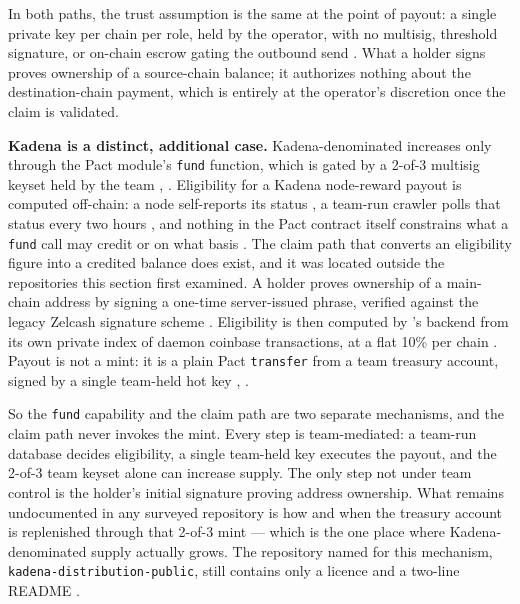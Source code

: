 In both paths, the trust assumption is the same at the point of payout: a single private key per
chain per role, held by the \Fusion operator, with no multisig, threshold signature, or on-chain
escrow gating the outbound send \shipped {}. What a holder
signs proves ownership of a source-chain balance; it authorizes nothing about the destination-chain
payment, which is entirely at the operator's discretion once the claim is validated.

\textbf{Kadena is a distinct, additional case.} Kadena-denominated \flux increases only through the
Pact module's \texttt{fund} function, which is gated by a 2-of-3 multisig keyset held by the team
\shipped {}, . Eligibility for a Kadena node-reward payout is
computed off-chain: a node self-reports its status
\shipped {}, a team-run crawler polls that
status every two hours \shipped {}, and
nothing in the Pact contract itself constrains what a \texttt{fund} call may credit or on what basis
\shipped {}. The claim path that converts an eligibility figure into a credited balance
does exist, and it was located outside the repositories this section first examined. A holder proves
ownership of a main-chain address by signing a one-time server-issued phrase, verified against the
legacy Zelcash signature scheme \shipped {}.
Eligibility is then computed by \Fusion's backend from its own private index of \Flux daemon coinbase
transactions, at a flat 10\% per chain
\shipped {}. Payout is not a mint: it is a
plain Pact \texttt{transfer} from a team treasury account, signed by a single team-held hot key
\shipped {}, .

So the \texttt{fund} capability and the claim path are two separate mechanisms, and the claim path
never invokes the mint. Every step is team-mediated: a team-run database decides eligibility, a single
team-held key executes the payout, and the 2-of-3 team keyset alone can increase supply. The only step
not under team control is the holder's initial signature proving address ownership. What remains
undocumented in any surveyed repository is how and when the treasury account is replenished through
that 2-of-3 mint --- which is the one place where Kadena-denominated supply actually grows. The
repository named for this mechanism, \texttt{kadena-\allowbreak{}distribution-\allowbreak{}public}, still contains only a licence
and a two-line README .

